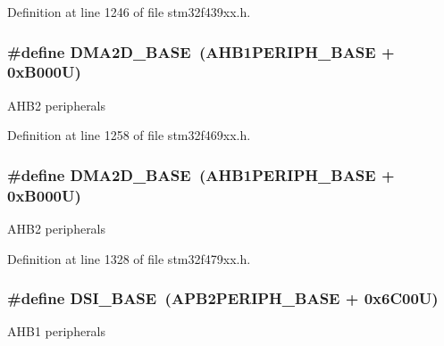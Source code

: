 Definition at line 1246 of file stm32f439xx.\+h.

\subsubsection[{\texorpdfstring{D\+M\+A2\+D\+\_\+\+B\+A\+SE}{DMA2D_BASE}}]{\setlength{\rightskip}{0pt plus 5cm}\#define D\+M\+A2\+D\+\_\+\+B\+A\+SE~({\bf A\+H\+B1\+P\+E\+R\+I\+P\+H\+\_\+\+B\+A\+SE} + 0x\+B000\+U)}\hypertarget{group___peripheral__memory__map_gacec66385fd1604e69584eb19a0aaa303}{}\label{group___peripheral__memory__map_gacec66385fd1604e69584eb19a0aaa303}
A\+H\+B2 peripherals 

Definition at line 1258 of file stm32f469xx.\+h.

\subsubsection[{\texorpdfstring{D\+M\+A2\+D\+\_\+\+B\+A\+SE}{DMA2D_BASE}}]{\setlength{\rightskip}{0pt plus 5cm}\#define D\+M\+A2\+D\+\_\+\+B\+A\+SE~({\bf A\+H\+B1\+P\+E\+R\+I\+P\+H\+\_\+\+B\+A\+SE} + 0x\+B000\+U)}\hypertarget{group___peripheral__memory__map_gacec66385fd1604e69584eb19a0aaa303}{}\label{group___peripheral__memory__map_gacec66385fd1604e69584eb19a0aaa303}
A\+H\+B2 peripherals 

Definition at line 1328 of file stm32f479xx.\+h.

\subsubsection[{\texorpdfstring{D\+S\+I\+\_\+\+B\+A\+SE}{DSI_BASE}}]{\setlength{\rightskip}{0pt plus 5cm}\#define D\+S\+I\+\_\+\+B\+A\+SE~({\bf A\+P\+B2\+P\+E\+R\+I\+P\+H\+\_\+\+B\+A\+SE} + 0x6\+C00\+U)}\hypertarget{group___peripheral__memory__map_gac094188b138a77bbac13d9361609b617}{}\label{group___peripheral__memory__map_gac094188b138a77bbac13d9361609b617}
A\+H\+B1 peripherals 

